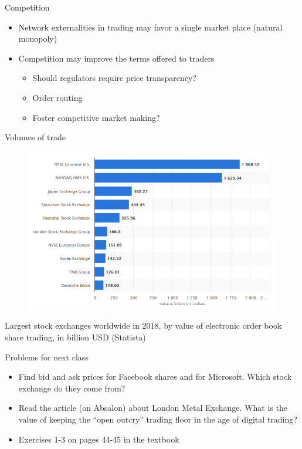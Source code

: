 \documentclass[english,10pt
,aspectratio=169
]{beamer}
\begin{document}
\begin{frame}{Competition}
\begin{itemize}
	\item Network externalities in trading may favor a single market place (natural monopoly)
	\item Competition may improve the terms offered to traders
	\begin{itemize}
		\item Should regulators require price transparency?
		\item Order routing
		\item Foster competitive market making?
	\end{itemize}
\end{itemize}
\end{frame}


\begin{frame}{Volumes of trade}
\begin{figure}
	\includegraphics[width=.75\paperwidth]{pics/volumes2018}
\end{figure}
Largest stock exchanges worldwide in 2018, by value of electronic order book share trading, in billion USD (Statista)
\end{frame}


\begin{frame}{Problems for next class}
\begin{itemize}
	\item Find bid and ask prices for Facebook shares and for Microsoft. Which stock exchange do they come from? 
	\item Read the article (on Absalon) about London Metal Exchange. What is the value of keeping the ``open outcry'' trading floor in the age of digital trading?
	\item Exercises 1-3 on pages 44-45 in the textbook
\end{itemize}
\end{frame}
\end{document}
